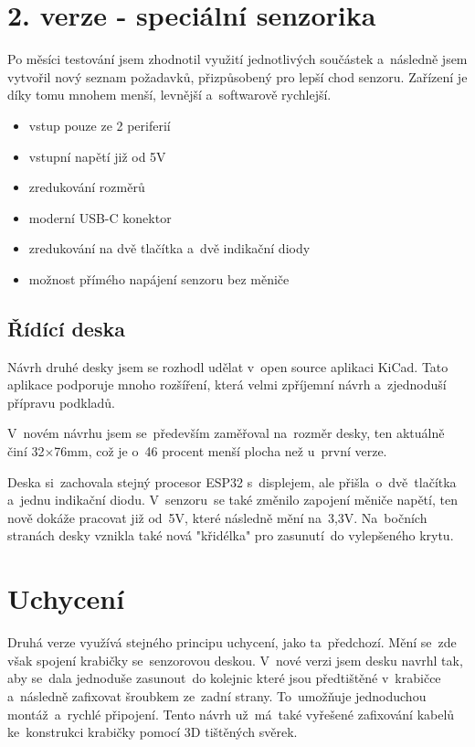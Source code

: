 \newpage





\section{2. verze - speciální senzorika}

Po měsíci testování jsem zhodnotil využití jednotlivých součástek a~následně jsem vytvořil nový seznam požadavků, přizpůsobený pro lepší chod senzoru.
Zařízení je díky tomu mnohem menší, levnější a~softwarově rychlejší.

\begin{itemize}
    \item vstup pouze ze 2 periferií
    \item vstupní napětí již od 5V
    \item zredukování rozměrů
    \item moderní USB-C konektor
    \item zredukování na dvě tlačítka a~dvě indikační diody
    \item možnost přímého napájení senzoru bez měniče
\end{itemize}

\subsection{Řídící deska}
Návrh druhé desky jsem se rozhodl udělat v~open source aplikaci KiCad.
Tato aplikace podporuje mnoho rozšíření, která velmi zpříjemní návrh a~zjednoduší přípravu podkladů.

V~novém návrhu jsem se~především zaměřoval na~rozměr desky, ten aktuálně činí 32$\times$76mm, což je o~46 procent menší plocha než u~první verze.

Deska si~zachovala stejný procesor ESP32 s~displejem, ale přišla~o~dvě~tlačítka a~jednu indikační diodu.
V~senzoru~se také změnilo zapojení měniče napětí, ten nově dokáže pracovat již od~5V, které následně mění na~3,3V.
Na~bočních stranách desky vznikla také nová "křidélka" pro zasunutí~do vylepšeného krytu.



\section{Uchycení}
Druhá verze využívá stejného principu uchycení, jako ta~předchozí. 
Mění se~zde však spojení krabičky se~senzorovou deskou. 
V~nové verzi jsem desku navrhl tak, aby se~dala jednoduše zasunout~do kolejnic které jsou předtištěné v~krabičce a~následně zafixovat šroubkem ze~zadní strany.
To~umožňuje jednoduchou montáž~a~rychlé připojení.
Tento návrh už~má~také vyřešené zafixování kabelů ke~konstrukci krabičky pomocí 3D tištěných svěrek.


